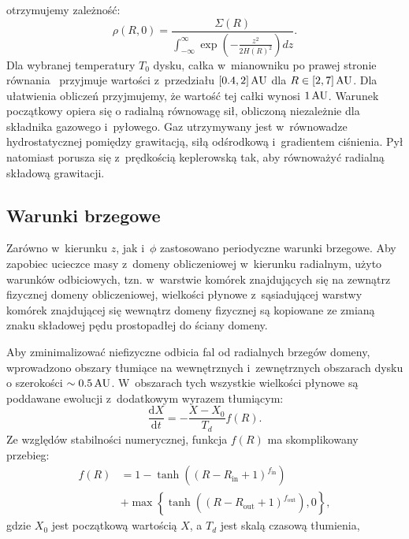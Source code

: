%
otrzymujemy zależność:
\begin{equation}
   \label{eq:rho}
    \rho(R,0) = \frac{\Sigma(R) }{\int_{-\infty}^\infty
   \exp\left(-\frac{z^2}{2H(R)^2}\right) dz}.
\end{equation}
Dla wybranej temperatury $T_0$ dysku, całka w~mianowniku po prawej stronie
równania~ przyjmuje wartości z~przedziału $[0.4,2]\hbox{$\thinspace\textrm{AU}$}$ dla $R \in
[2,7]\hbox{$\thinspace\textrm{AU}$}$. Dla ułatwienia obliczeń przyjmujemy, że wartość tej całki wynosi $1\hbox{$\thinspace\textrm{AU}$}$.
Warunek początkowy opiera się o radialną równowagę sił, obliczoną niezależnie dla
składnika gazowego i~pyłowego. Gaz utrzymywany jest w~równowadze hydrostatycznej
pomiędzy grawitacją, siłą odśrodkową i~gradientem ciśnienia. Pył natomiast
porusza się z~prędkością keplerowską tak, aby równoważyć radialną składową
grawitacji.

\subsection{Warunki brzegowe}
Zarówno w~kierunku $z$, jak i~$\phi$ zastosowano periodyczne warunki brzegowe.
Aby zapobiec ucieczce masy z~domeny obliczeniowej w~kierunku radialnym, użyto
warunków odbiciowych, 
tzn. w~warstwie komórek znajdujących się na zewnątrz fizycznej domeny
obliczeniowej, wielkości płynowe z~sąsiadującej warstwy komórek znajdującej się
wewnątrz domeny fizycznej są kopiowane ze zmianą znaku składowej pędu
prostopadłej do ściany domeny.
\par Aby zminimalizować niefizyczne odbicia fal od radialnych brzegów domeny,
wprowadzono obszary tłumiące na wewnętrznych i~zewnętrznych obszarach dysku o
szerokości $\sim0.5\hbox{$\thinspace\textrm{AU}$}$. W~obszarach tych wszystkie wielkości płynowe są
poddawane ewolucji z~dodatkowym wyrazem tłumiącym:
\begin{equation}
  \frac{\textrm{d}X}{\textrm{d}t} = - \frac{X-X_0}{T_d}f(R).
\end{equation}
Ze względów stabilności numerycznej, funkcja $f(R)$ ma skomplikowany przebieg:
\begin{equation}\label{eq:overlap}
   \begin{split} 
      f(R) &= 1 - \tanh\left(\left(R - R_\textrm{in} + 1
      \right)^{f_\textrm{in}}\right)\\ &+ \max\left\{ \tanh\left(\left(R -
      R_\textrm{out} + 1\right)^{f_\textrm{out}}\right), 0\right\}, 
   \end{split}
\end{equation}
gdzie $X_0$ jest początkową wartością $X$, a $T_d$ jest skalą czasową tłumienia,
